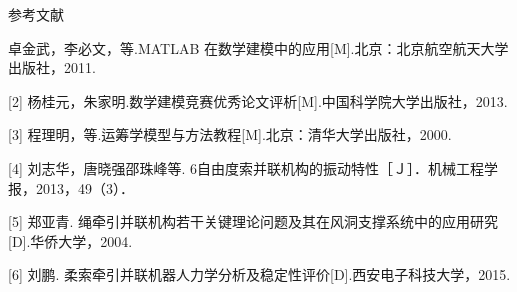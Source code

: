 \documentclass[withoutpreface,bwprint]{cumcmthesis}
\begin{document}
\begin{center}
	
	参考文献\\
	
\end{center}
\begin{flushleft}
	[1] 卓金武，李必文，等.MATLAB 在数学建模中的应用[M].北京：北京航空航天大学出版社，2011.

	[2] 杨桂元，朱家明.数学建模竞赛优秀论文评析[M].中国科学院大学出版社，2013.
	
	[3] 程理明，等.运筹学模型与方法教程[M].北京：清华大学出版社，2000.
	
	[4] 刘志华，唐晓强邵珠峰等. 6自由度索并联机构的振动特性［Ｊ］．机械工程学报，2013，49（3）．
	
	[5] 郑亚青. 绳牵引并联机构若干关键理论问题及其在风洞支撑系统中的应用研究[D].华侨大学，2004.
	
    [6] 刘鹏. 柔索牵引并联机器人力学分析及稳定性评价[D].西安电子科技大学，2015.
\end{flushleft}
\end{document}

